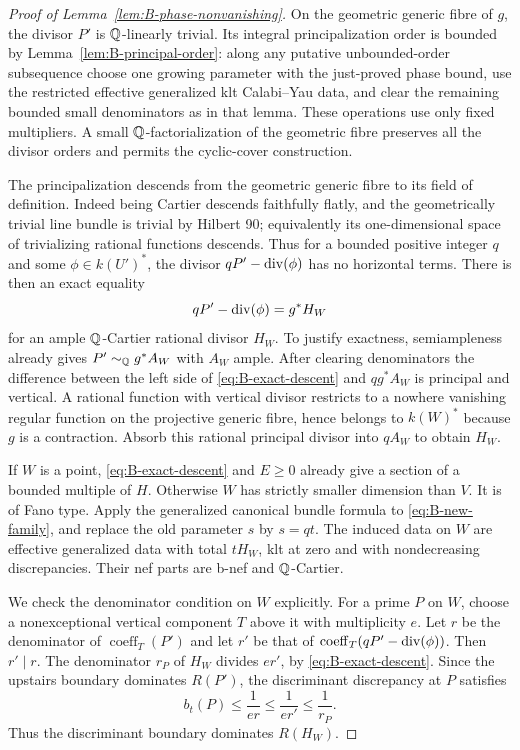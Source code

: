 \begin{proof}[Proof of Lemma~\ref{lem:B-phase-nonvanishing}]
On the geometric generic fibre of $g$, the divisor $P'$
is $\mathbb Q$-linearly trivial.  Its integral principalization
order is bounded by Lemma~\ref{lem:B-principal-order}:
along any putative unbounded-order subsequence choose one
growing parameter with the just-proved phase bound, use
the restricted effective generalized klt Calabi--Yau
data, and clear the remaining bounded small denominators
as in that lemma.  These operations use only fixed
multipliers.  A small $\mathbb Q$-factorialization of the
geometric fibre preserves all the divisor orders and
permits the cyclic-cover construction.

The principalization descends from the geometric generic
fibre to its field of definition.  Indeed being Cartier
descends faithfully flatly, and the geometrically trivial
line bundle is trivial by Hilbert 90; equivalently its
one-dimensional space of trivializing rational functions
descends.  Thus for a bounded positive integer $q$ and
some $\phi\in k(U')^*$, the divisor
$qP'-\operatorname{div}(\phi)$ has no horizontal terms.  There is
then an exact equality
\begin{equation}\label{eq:B-exact-descent}
 qP'-\operatorname{div}(\phi)=g^*H_W
\end{equation}
for an ample $\mathbb Q$-Cartier rational divisor $H_W$.
To justify exactness, semiampleness already gives
$P'\sim_{\mathbb Q}g^*A_W$ with $A_W$ ample.  After clearing
denominators the difference between the left side of
\eqref{eq:B-exact-descent} and $qg^*A_W$ is principal
and vertical.  A rational function with vertical divisor
restricts to a nowhere vanishing regular function on
the projective generic fibre, hence belongs to $k(W)^*$
because $g$ is a contraction.  Absorb this rational
principal divisor into $qA_W$ to obtain $H_W$.

If $W$ is a point, \eqref{eq:B-exact-descent} and $E\ge0$
already give a section of a bounded multiple of $H$.
Otherwise $W$ has strictly smaller dimension than $V$.
It is of Fano type.  Apply the generalized canonical
bundle formula to \eqref{eq:B-new-family}, and
replace the old parameter $s$ by $s=qt$.  The induced
data on $W$ are effective generalized data with total
$tH_W$, klt at zero and with nondecreasing discrepancies.
Their nef parts are b-nef and $\mathbb Q$-Cartier.

We check the denominator condition on $W$ explicitly.
For a prime $P$ on $W$, choose a nonexceptional vertical
component $T$ above it with multiplicity $e$.  Let $r$
be the denominator of $\operatorname{coeff}_T(P')$ and
let $r'$ be that of
$\operatorname{coeff}_T(qP'-\operatorname{div}(\phi))$.
Then $r'\mid r$.  The denominator $r_P$ of $H_W$
divides $er'$, by \eqref{eq:B-exact-descent}.
Since the upstairs boundary dominates $R(P')$, the
discriminant discrepancy at $P$ satisfies
\[
 b_t(P)\le\frac1{er}\le\frac1{er'}\le\frac1{r_P}.
\]
Thus the discriminant boundary dominates $R(H_W)$.


\end{proof}

